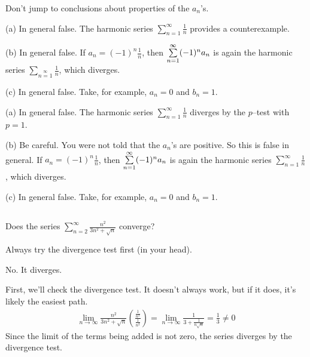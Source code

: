 \begin{hint}
Don't jump to conclusions about properties of the $a_n$'s.
\end{hint}

\begin{answer}
(a) In general false. The harmonic series $\sum\limits_{n=1}^\infty\frac{1}{n}$
provides a counterexample.

\noindent (b)
In general false. If $a_n =(-1)^n\frac{1}{n}$, then
$\sum\limits_{n=1}^{\infty} (-1)^{n\mathstrut} a_n$ is again the harmonic series
$\sum_{n=1}\limits^\infty\frac{1}{n}$, which diverges.

\noindent (c)
In general false. Take, for example, $a_n=0$ and $b_n=1$.

\end{answer}

\begin{solution} (a)
In general false. The harmonic series $\sum\limits_{n=1}^\infty\frac{1}{n}$
diverges by the $p$--test with $p=1$.


\noindent (b)
Be careful. You were not told that the $a_n$'s are positive. So this is false in general.
If $a_n =(-1)^n\frac{1}{n}$, then
$\sum\limits_{n=1}^{\infty} (-1)^{n\mathstrut} a_n$ is again the harmonic series
$\sum\limits_{n=1}^\infty\frac{1}{n}$, which diverges.

\noindent (c)
In general false. Take, for example, $a_n=0$ and $b_n=1$.

\end{solution}




\subsection*{\Procedural}

\begin{question}[2016Q5]
Does the series $\displaystyle \sum_{n=2}^\infty \frac{n^2}{3n^2+\sqrt n}$ converge?
\end{question}

\begin{hint}
Always try the divergence test first (in your head).
\end{hint}

\begin{answer}
No. It diverges.
\end{answer}

\begin{solution}
First, we'll check the divergence test. It doesn't always work, but if it does, it's likely the easiest path.
\begin{align*}
\lim_{n\to\infty} \frac{n^2}{3n^2+\sqrt n} \left(\frac{\frac{1}{n^2}}{\frac{1}{n^2}}\right)
 =  \lim_{n\to\infty} \frac{1}{3+\frac{1}{n\sqrt n}}
 = \frac{1}{3}
 \neq 0
\end{align*}
Since the limit of the terms being added is not zero, the series diverges by the divergence test.
\end{solution}

